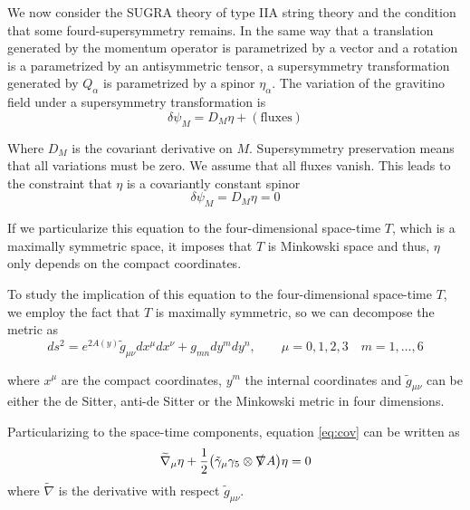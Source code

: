 We now consider the SUGRA theory of type IIA string theory and
the condition that some fourd-supersymmetry remains.
In the same way that a translation generated by the momentum operator is parametrized by a vector and
a rotation is a parametrized by an antisymmetric tensor, a supersymmetry transformation generated
by $Q_\alpha$ is parametrized 
by a spinor $\eta_\alpha$.
The variation of the gravitino field under a supersymmetry transformation is
\begin{equation}
  \delta \psi_M = D_M \eta + \mathrm{(fluxes)}
\end{equation}

Where $D_M$ is the covariant derivative on $M$.
Supersymmetry preservation means that all variations must be zero. 
We assume that all fluxes vanish.
This leads to the constraint that $\eta$ is a covariantly constant spinor
\begin{equation}
  \delta \psi_M = D_M \eta = 0
  \label{eq:cov}
\end{equation}

If we particularize this equation to the four-dimensional space-time  $T$, which is a maximally symmetric space, 
it imposes that $T$ is Minkowski space and thus, $\eta$ only depends on the compact coordinates.

To study the implication of this equation to the four-dimensional space-time $T$, we employ the 
fact that $T$ is maximally symmetric, so we can decompose  the metric as
\begin{equation}
  ds^2=e^{2A(y)}\tilde {g}_{\mu\nu} dx^\mu dx^\nu + g_{mn} dy^m dy^n, \qquad  \mu=0,1,2,3 \quad m=1,\dots,6
\end{equation}

where $x^\mu$ are the compact coordinates, $y^m$ the internal coordinates and $\tilde{g}_{\mu\nu}$ can 
be either the de Sitter, anti-de Sitter or the Minkowski metric in four dimensions.

Particularizing to the space-time components, equation \eqref{eq:cov} can be written as
\begin{equation}
  \widetilde{\nabla}_\mu \eta + \frac{1}{2}\qty(\tilde{\gamma}_\mu \gamma_5 \otimes \slashed \nabla A) \eta=0
\end{equation}
where $\widetilde{\nabla}$ is the derivative with respect $\tilde g_{\mu\nu}$.

